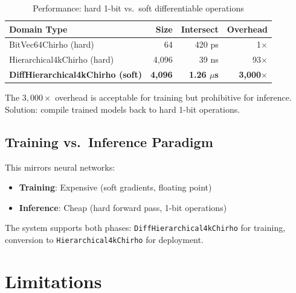 \documentclass[11pt,a4paper]{article}
\begin{document}
\begin{table}[ht]
\centering
\caption{Performance: hard 1-bit vs.\ soft differentiable operations}
\label{tab:soft_hard_chirho}
\begin{tabular}{lrrr}
\toprule
\textbf{Domain Type} & \textbf{Size} & \textbf{Intersect} & \textbf{Overhead} \\
\midrule
BitVec64Chirho (hard) & 64 & 420 ps & 1$\times$ \\
Hierarchical4kChirho (hard) & 4,096 & 39 ns & 93$\times$ \\
\textbf{DiffHierarchical4kChirho (soft)} & \textbf{4,096} & \textbf{1.26 $\mu$s} & \textbf{3,000$\times$} \\
\bottomrule
\end{tabular}
\end{table}

The $3{,}000\times$ overhead is acceptable for training but prohibitive for inference.
Solution: compile trained models back to hard 1-bit operations.

\subsection{Training vs.\ Inference Paradigm}
\label{subsec:train_infer_chirho}

This mirrors neural networks:
\begin{itemize}
  \item \textbf{Training}: Expensive (soft gradients, floating point)
  \item \textbf{Inference}: Cheap (hard forward pass, 1-bit operations)
\end{itemize}

The system supports both phases: \texttt{DiffHierarchical4kChirho} for training, conversion to \texttt{Hierarchical4kChirho} for deployment.

\section{Limitations}
\label{sec:limitations_chirho}
\end{document}
